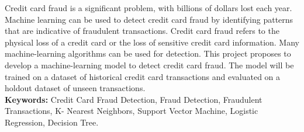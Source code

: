 Credit card fraud is a significant problem, with billions of dollars lost each year. Machine learning 
can be used to detect credit card fraud by identifying patterns that are indicative of fraudulent 
transactions. Credit card fraud refers to the physical loss of a credit card or the loss of sensitive credit 
card information. Many machine-learning algorithms can be used for detection. This project proposes 
to develop a machine-learning model to detect credit card fraud. The model will be trained on a dataset 
of historical credit card transactions and evaluated on a holdout dataset of unseen transactions.\\
\textbf{Keywords:} Credit Card Fraud Detection, Fraud Detection, Fraudulent Transactions, K- Nearest 
Neighbors, Support Vector Machine, Logistic Regression, Decision Tree. 

